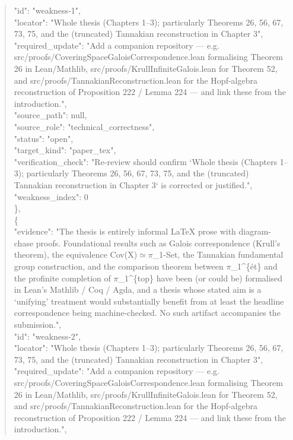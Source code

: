 \documentclass[11pt]{article}
\begin{document}
\begin{quote}
      "id": "weakness-1",\\
      "locator": "Whole thesis (Chapters 1--3); particularly Theorems 26, 56, 67, 73, 75, and the (truncated) Tannakian reconstruction in Chapter 3",\\
      "required\_update": "Add a companion repository --- e.g. src/proofs/CoveringSpaceGaloisCorrespondence.lean formalising Theorem 26 in Lean/Mathlib, src/proofs/KrullInfiniteGalois.lean for Theorem 52, and src/proofs/TannakianReconstruction.lean for the Hopf-algebra reconstruction of Proposition 222 / Lemma 224 --- and link these from the introduction.",\\
      "source\_path": null,\\
      "source\_role": "technical\_correctness",\\
      "status": "open",\\
      "target\_kind": "paper\_tex",\\
      "verification\_check": "Re-review should confirm `Whole thesis (Chapters 1--3); particularly Theorems 26, 56, 67, 73, 75, and the (truncated) Tannakian reconstruction in Chapter 3` is corrected or justified.",\\
      "weakness\_index": 0\\
    \},\\
    \{\\
      "evidence": "The thesis is entirely informal LaTeX prose with diagram-chase proofs. Foundational results such as Galois correspondence (Krull’s theorem), the equivalence Cov(X)\ensuremath{\simeq}\ensuremath{\pi}\_1-Set, the Tannakian fundamental group construction, and the comparison theorem between \ensuremath{\pi}\_1\^{}\{ét\} and the profinite completion of \ensuremath{\pi}\_1\^{}\{top\} have been (or could be) formalised in Lean’s Mathlib / Coq / Agda, and a thesis whose stated aim is a ‘unifying’ treatment would substantially benefit from at least the headline correspondence being machine-checked. No such artifact accompanies the submission.",\\
      "id": "weakness-2",\\
      "locator": "Whole thesis (Chapters 1--3); particularly Theorems 26, 56, 67, 73, 75, and the (truncated) Tannakian reconstruction in Chapter 3",\\
      "required\_update": "Add a companion repository --- e.g. src/proofs/CoveringSpaceGaloisCorrespondence.lean formalising Theorem 26 in Lean/Mathlib, src/proofs/KrullInfiniteGalois.lean for Theorem 52, and src/proofs/TannakianReconstruction.lean for the Hopf-algebra reconstruction of Proposition 222 / Lemma 224 --- and link these from the introduction.",\\

\end{quote}
\end{document}
